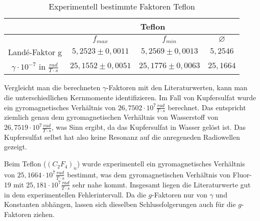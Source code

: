 \begin{table}[h]
	\caption{Experimentell bestimmte Faktoren Teflon}
	\begin{tabular}{|c|c|c|c|}
	\hline
	& \multicolumn{3}{|c|}{Teflon} \\ \hline
	&  $f_{max}$ & $f_{min}$ &  $\varnothing$ \\ \hline
	Landé-Faktor g  & $5,2523\pm0,0011$ & $5,2569\pm0,0013$ & $5,2546$ \\ \hline
	$\gamma \cdot 10^{-7}$ in $\frac{rad}{T\cdot s}$&  $25,1552\pm0,0051$ & $25,1776\pm0,0063$ & $25,1664$\\ \hline
	\end{tabular}
\label{gammas2}
\end{table}	

Vergleicht man die berechneten $\gamma$-Faktoren mit den Literaturwerten, kann man die unterschiedlichen Kernmomente identifizieren. Im Fall von Kupfersulfat wurde ein gyromagnetisches Verhältnis von $26,7502\cdot 10^7\frac{rad}{T\cdot s}$ berechnet. Das entspricht ziemlich genau dem gyromagnetischen Verhältnis von Wasserstoff von $26,7519\cdot 10^7\frac{rad}{T\cdot s}$, was Sinn ergibt, da das Kupfersulfat in Wasser gelöst ist. Das Kupfersulfat selbst hat also keine Resonanz auf die anregeneden Radiowellen gezeigt.

Beim Teflon ($(C_2F_4)_n$) wurde experimentell ein gyromagnetisches Verhältnis von $25,1664\cdot 10^7\frac{rad}{T\cdot s}$ bestimmt, was dem gyromagnetischen Verhältnis von Fluor-19 mit $25,181\cdot 10^7\frac{rad}{T\cdot s}$ sehr nahe kommt. Insgesamt liegen die Literaturwerte gut in dem experimentellen Fehlerintervall. Da die $g$-Faktoren nur von $\gamma$ und Konstanten abhängen, lassen sich dieselben Schlussfolgerungen auch für die $g$-Faktoren ziehen.
